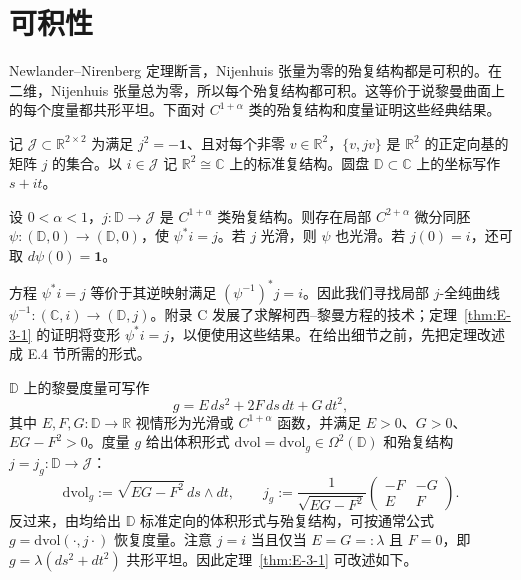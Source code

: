 
\section{可积性}\label{sec:E-3}

Newlander--Nirenberg 定理断言，Nijenhuis 张量为零的殆复结构都是可积的。在二维，Nijenhuis 张量总为零，所以每个殆复结构都可积。这等价于说黎曼曲面上的每个度量都共形平坦。下面对 $C^{1+\alpha}$ 类的殆复结构和度量证明这些经典结果。

记 $\mathcal J\subset\mathbb R^{2\times2}$ 为满足 $j^2=-\mathbf1$、且对每个非零 $v\in\mathbb R^2$，$\{v,jv\}$ 是 $\mathbb R^2$ 的正定向基的矩阵 $j$ 的集合。以 $i\in\mathcal J$ 记 $\mathbb R^2\cong\mathbb C$ 上的标准复结构。圆盘 $\mathbb D\subset\mathbb C$ 上的坐标写作 $s+it$。

\begin{theorem}\label{thm:E-3-1}
设 $0<\alpha<1$，$j:\mathbb D\to\mathcal J$ 是 $C^{1+\alpha}$ 类殆复结构。则存在局部 $C^{2+\alpha}$ 微分同胚 $\psi:(\mathbb D,0)\to(\mathbb D,0)$，使 $\psi^*i=j$。若 $j$ 光滑，则 $\psi$ 也光滑。若 $j(0)=i$，还可取 $d\psi(0)=\mathbf1$。
\end{theorem}

方程 $\psi^*i=j$ 等价于其逆映射满足 $(\psi^{-1})^*j=i$。因此我们寻找局部 $j$-全纯曲线 $\psi^{-1}:(\mathbb C,i)\to(\mathbb D,j)$。附录 C 发展了求解柯西--黎曼方程的技术；定理~\ref{thm:E-3-1} 的证明将变形 $\psi^*i=j$，以便使用这些结果。在给出细节之前，先把定理改述成 E.4 节所需的形式。

$\mathbb D$ 上的黎曼度量可写作
\[
  g=E\,ds^2+2F\,ds\,dt+G\,dt^2,
\]
其中 $E,F,G:\mathbb D\to\mathbb R$ 视情形为光滑或 $C^{1+\alpha}$ 函数，并满足 $E>0$、$G>0$、$EG-F^2>0$。度量 $g$ 给出体积形式 $\mathrm{dvol}=\mathrm{dvol}_g\in\Omega^2(\mathbb D)$ 和殆复结构 $j=j_g:\mathbb D\to\mathcal J$：
\[
  \mathrm{dvol}_g:=\sqrt{EG-F^2}\,ds\wedge dt,
  \qquad
  j_g:=\frac1{\sqrt{EG-F^2}}
  \begin{pmatrix}-F&-G\\ E&F\end{pmatrix}.
\]
反过来，由均给出 $\mathbb D$ 标准定向的体积形式与殆复结构，可按通常公式 $g=\mathrm{dvol}(\cdot,j\cdot)$ 恢复度量。注意 $j=i$ 当且仅当 $E=G=: \lambda$ 且 $F=0$，即 $g=\lambda(ds^2+dt^2)$ 共形平坦。因此定理~\ref{thm:E-3-1} 可改述如下。


